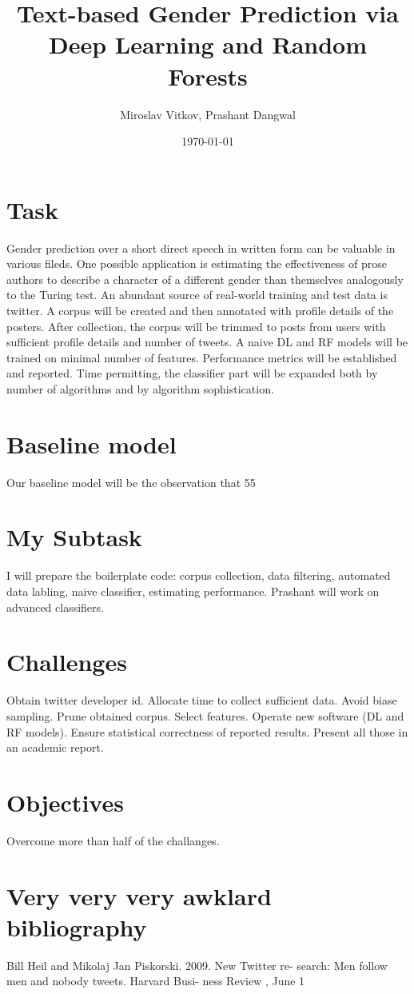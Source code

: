 \documentclass{article}
\title{Text-based Gender Prediction via Deep Learning and Random Forests}
\author{Miroslav Vitkov, Prashant Dangwal}
\date{\today}
\begin{document}
\maketitle


\section{Task}
Gender prediction over a short direct speech in written form can be valuable in various fileds.
One possible application is estimating the effectiveness of prose authors to describe a character of a different gender than themselves analogously to the Turing test.
An abundant source of real-world training and test data is twitter.
A corpus will be created and then annotated with profile details of the posters.
After collection, the corpus will be trimmed to posts from users with sufficient profile details and number of tweets.
A naive DL and RF models will be trained on minimal number of features.
Performance metrics will be established and reported.
Time permitting, the classifier part will be expanded both by number of algorithms and by algorithm sophistication. 


\section{Baseline model}
Our baseline model will be the observation that 55%


\section{My Subtask}
I will prepare the boilerplate code: corpus collection, data filtering, automated data labling, naive classifier, estimating performance.
Prashant will work on advanced classifiers.


\section{Challenges}
Obtain twitter developer id. 
Allocate time to collect sufficient data.
Avoid biase sampling.
Prune obtained corpus.
Select features.
Operate new software (DL and RF models).
Ensure statistical correctness of reported results.
Present all those in an academic report.


\section{Objectives}
Overcome more than half of the challanges.


\section{Very very very awklard bibliography}
Bill Heil and Mikolaj Jan Piskorski. 2009. New Twitter re-
search: Men follow men and nobody tweets.
Harvard Busi-
ness Review
, June 1
\end{document}
